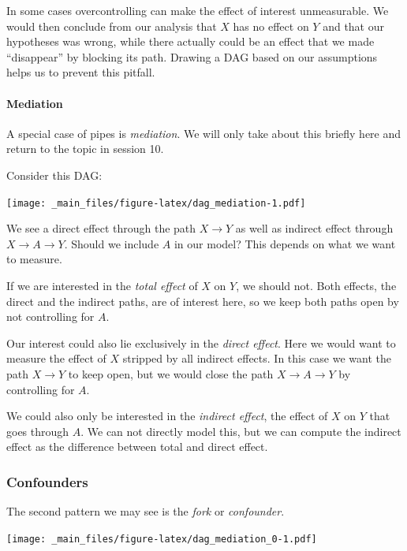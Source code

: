 \documentclass[
]{book}
\begin{document}
In some cases overcontrolling can make the effect of interest unmeasurable. We
would then conclude from our analysis that \(X\) has no effect on \(Y\) and that our
hypotheses was wrong, while there actually could be an effect that we made
``disappear'' by blocking its path. Drawing a DAG based on our assumptions helps
us to prevent this pitfall.

\hypertarget{mediation}{%
\paragraph{Mediation}\label{mediation}}

A special case of pipes is \emph{mediation}. We will only take about this briefly
here and return to the topic in session 10.

Consider this DAG:

\texttt{[image: \_main\_files/figure-latex/dag\_mediation-1.pdf]}

We see a direct effect through the path \(X \rightarrow Y\) as well as indirect
effect through \(X \rightarrow A \rightarrow Y\). Should we include \(A\) in our
model? This depends on what we want to measure.

If we are interested in the \emph{total effect} of \(X\) on \(Y\), we should not. Both
effects, the direct and the indirect paths, are of interest here, so we keep
both paths open by not controlling for \(A\).

Our interest could also lie exclusively in the \emph{direct effect}. Here we would
want to measure the effect of \(X\) stripped by all indirect effects. In this case
we want the path \(X \rightarrow Y\) to keep open, but we would close the path
\(X \rightarrow A \rightarrow Y\) by controlling for \(A\).

We could also only be interested in the \emph{indirect effect}, the effect
of \(X\) on \(Y\) that goes through \(A\). We can not directly model this, but we can
compute the indirect effect as the difference between total and direct effect.

\hypertarget{confounders}{%
\subsubsection{Confounders}\label{confounders}}

The second pattern we may see is the \emph{fork} or \emph{confounder}.

\texttt{[image: \_main\_files/figure-latex/dag\_mediation\_0-1.pdf]}
\end{document}
